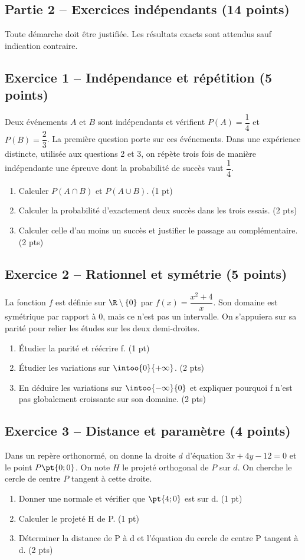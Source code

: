 \mxnewpage\subsection*{Partie 2 -- Exercices indépendants (14 points)}
Toute démarche doit être justifiée. Les résultats exacts sont attendus sauf indication contraire.
\subsection*{Exercice 1 -- Indépendance et répétition (5 points)}
Deux événements $A$ et $B$ sont indépendants et vérifient $P(A)=\dfrac14$ et $P(B)=\dfrac23$. La première question porte sur ces événements. Dans une expérience distincte, utilisée aux questions 2 et 3, on répète trois fois de manière indépendante une épreuve dont la probabilité de succès vaut $\dfrac14$.
\begin{enumerate}
\item Calculer $P(A\cap B)$ et $P(A\cup B)$. \hfill(1 pt)
\item Calculer la probabilité d’exactement deux succès dans les trois essais. \hfill(2 pts)
\item Calculer celle d’au moins un succès et justifier le passage au complémentaire. \hfill(2 pts)
\end{enumerate}
\subsection*{Exercice 2 -- Rationnel et symétrie (5 points)}
La fonction $f$ est définie sur $\R\setminus\{0\}$ par $f(x)=\dfrac{x^2+4}{x}$. Son domaine est symétrique par rapport à 0, mais ce n’est pas un intervalle. On s’appuiera sur sa parité pour relier les études sur les deux demi-droites.
\begin{enumerate}
\item Étudier la parité et réécrire f. \hfill(1 pt)
\item Étudier les variations sur $\intoo{0}{+\infty}$. \hfill(2 pts)
\item En déduire les variations sur $\intoo{-\infty}{0}$ et expliquer pourquoi f n’est pas globalement croissante sur son domaine. \hfill(2 pts)
\end{enumerate}
\subsection*{Exercice 3 -- Distance et paramètre (4 points)}
Dans un repère orthonormé, on donne la droite $d$ d’équation $3x+4y-12=0$ et le point $P\pt{0;0}$. On note $H$ le projeté orthogonal de $P$ sur $d$. On cherche le cercle de centre $P$ tangent à cette droite.
\begin{enumerate}
\item Donner une normale et vérifier que $\pt{4;0}$ est sur d. \hfill(1 pt)
\item Calculer le projeté H de P. \hfill(1 pt)
\item Déterminer la distance de P à d et l’équation du cercle de centre P tangent à d. \hfill(2 pts)
\end{enumerate}
